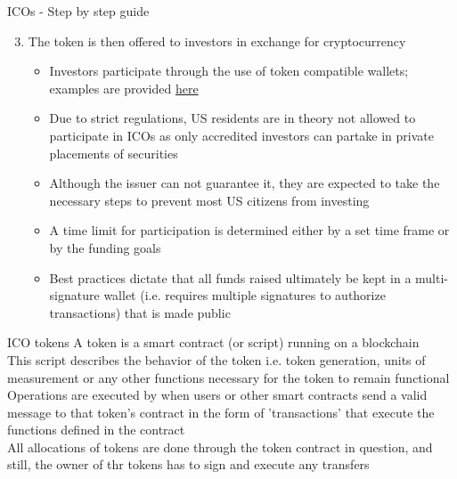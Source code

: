 \documentclass[10pt]{beamer}
\begin{document}

\begin{frame}{ICOs - Step by step guide}
	\begin{enumerate}
		\setcounter{enumi}{2}
		\item The token is then offered to investors in exchange for cryptocurrency
		\begin{itemize}
			\item Investors participate through the use of token compatible wallets; examples are provided \href{https://tokenmarket.net/what-is/how-to-participate-ethereum-token-crowdsale/}{here}
			\item Due to strict regulations, US residents are in theory not allowed to participate in ICOs as only accredited investors can partake in private placements of securities
			\item Although the issuer can not guarantee it, they are expected to take the necessary steps to prevent most US citizens from investing
			\item A time limit for participation is determined either by a set time frame or by the funding goals
			\item Best practices dictate that all funds raised ultimately be kept in a multi-signature wallet (i.e. requires multiple signatures to authorize transactions) that is made public
		\end{itemize}
	\end{enumerate}
\end{frame}


\begin{frame}{ICO tokens}
	A token is a smart contract (or script) running on a blockchain\\ \vspace{3mm}
	This script describes the behavior of the token i.e. token generation, units of measurement or any other functions necessary for the token to remain functional\\ \vspace{3mm}
	Operations are executed by when users or other smart contracts send a valid message to that token's contract in the form of 'transactions' that execute the functions defined in the contract\\ \vspace{3mm}
	All allocations of tokens are done through the token contract in question, and still, the owner of thr tokens has to sign and execute any transfers
\end{frame}
\end{document}
